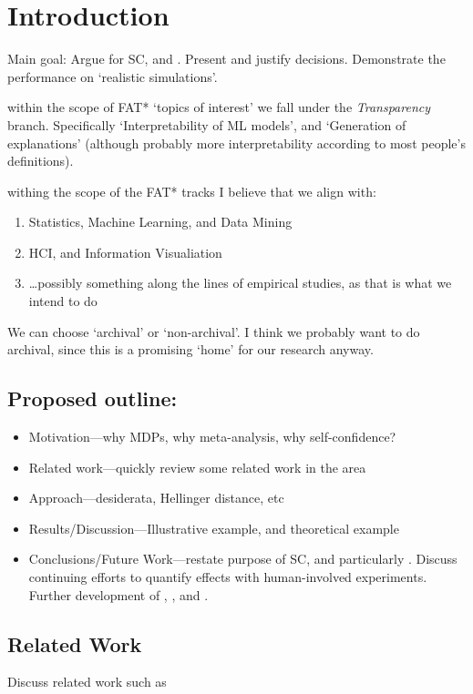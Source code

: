 \section{Introduction}
Main goal: Argue for SC, and \xQ. Present \xQ{} and justify decisions. Demonstrate the performance on `realistic simulations'.

within the scope of FAT* `topics of interest' we fall under the \emph{Transparency} branch. Specifically `Interpretability of ML models', and `Generation of explanations' (although probably more interpretability according to most people's definitions).

withing the scope of the FAT* tracks I believe that we align with:

\begin{enumerate}
    \item Statistics, Machine Learning, and Data Mining
    \item HCI, and Information Visualiation
    \item \ldots possibly something along the lines of empirical studies, as that is what we intend to do
\end{enumerate}

We can choose `archival' or `non-archival'. I think we probably want to do archival, since this is a promising `home' for our research anyway.

\subsection{Proposed outline:}

\begin{itemize}
    \item Motivation---why MDPs, why meta-analysis, why self-confidence?
    \item Related work---quickly review some related work in the area
    \item Approach---desiderata, Hellinger distance, etc
    \item Results/Discussion---Illustrative example, and theoretical example
    \item Conclusions/Future Work---restate purpose of SC, and particularly \xQ. Discuss continuing efforts to quantify effects with human-involved experiments. Further development of \xH, \xI, and \xM.
\end{itemize}

\subsection{Related Work}
    Discuss related work such as

